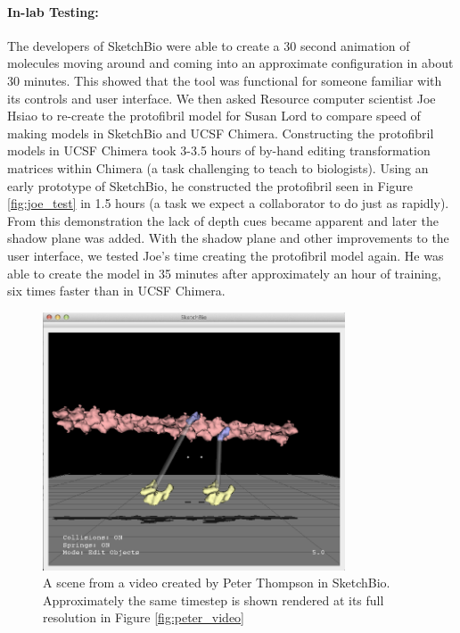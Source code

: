 \documentclass{article} %
\begin{document}
\paragraph{In-lab Testing:}
The developers of SketchBio were able to create a 30 second animation of molecules moving around and coming into an approximate configuration in about 30 minutes.  This showed that the tool was functional for someone familiar with its controls and user interface.  We then asked Resource computer scientist Joe Hsiao to re-create the protofibril model for Susan Lord to compare speed of making models in SketchBio and UCSF Chimera.  Constructing the protofibril models in UCSF Chimera took 3-3.5 hours of by-hand editing transformation matrices within Chimera (a task challenging to teach to biologists).  Using an early prototype of SketchBio, he constructed the protofibril seen in Figure \ref{fig:joe_test} in 1.5 hours (a task we expect a collaborator to do just as rapidly).  From this demonstration the lack of depth cues became apparent and later the shadow plane was added.  With the shadow plane and other improvements to the user interface, we tested Joe's time creating the protofibril model again.  He was able to create the model in 35 minutes after approximately an hour of training, six times faster than in UCSF Chimera.



\begin{figure}[h]
\centering
\includegraphics[width=0.8\textwidth]{peter_model.png}
\caption{A scene from a video created by Peter Thompson in SketchBio.  Approximately the same timestep is shown rendered at its full resolution in Figure \ref{fig:peter_video}}
\label{fig:peter_model}
\end{figure}
\end{document}
